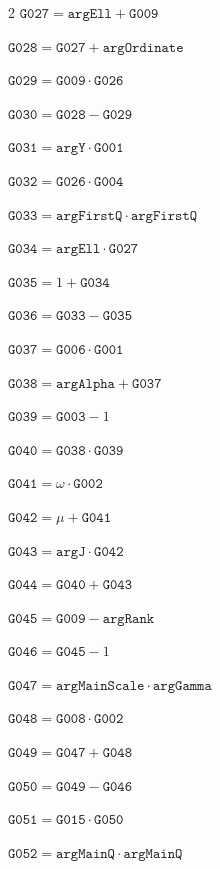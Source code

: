 \documentclass[10pt]{article}
\begin{document}
\begin{multicols}{2}
\noindent $\mathtt{G027}=\mathtt{argEll}+\mathtt{G009}$\par
\noindent $\mathtt{G028}=\mathtt{G027}+\mathtt{argOrdinate}$\par
\noindent $\mathtt{G029}=\mathtt{G009}\cdot \mathtt{G026}$\par
\noindent $\mathtt{G030}=\mathtt{G028}-\mathtt{G029}$\par
\noindent $\mathtt{G031}=\mathtt{argY}\cdot \mathtt{G001}$\par
\noindent $\mathtt{G032}=\mathtt{G026}\cdot \mathtt{G004}$\par
\noindent $\mathtt{G033}=\mathtt{argFirstQ}\cdot \mathtt{argFirstQ}$\par
\noindent $\mathtt{G034}=\mathtt{argEll}\cdot \mathtt{G027}$\par
\noindent $\mathtt{G035}=1+\mathtt{G034}$\par
\noindent $\mathtt{G036}=\mathtt{G033}-\mathtt{G035}$\par
\noindent $\mathtt{G037}=\mathtt{G006}\cdot \mathtt{G001}$\par
\noindent $\mathtt{G038}=\mathtt{argAlpha}+\mathtt{G037}$\par
\noindent $\mathtt{G039}=\mathtt{G003}-1$\par
\noindent $\mathtt{G040}=\mathtt{G038}\cdot \mathtt{G039}$\par
\noindent $\mathtt{G041}=\omega\cdot \mathtt{G002}$\par
\noindent $\mathtt{G042}=\mu+\mathtt{G041}$\par
\noindent $\mathtt{G043}=\mathtt{argJ}\cdot \mathtt{G042}$\par
\noindent $\mathtt{G044}=\mathtt{G040}+\mathtt{G043}$\par
\noindent $\mathtt{G045}=\mathtt{G009}-\mathtt{argRank}$\par
\noindent $\mathtt{G046}=\mathtt{G045}-1$\par
\noindent $\mathtt{G047}=\mathtt{argMainScale}\cdot \mathtt{argGamma}$\par
\noindent $\mathtt{G048}=\mathtt{G008}\cdot \mathtt{G002}$\par
\noindent $\mathtt{G049}=\mathtt{G047}+\mathtt{G048}$\par
\noindent $\mathtt{G050}=\mathtt{G049}-\mathtt{G046}$\par
\noindent $\mathtt{G051}=\mathtt{G015}\cdot \mathtt{G050}$\par
\noindent $\mathtt{G052}=\mathtt{argMainQ}\cdot \mathtt{argMainQ}$\par

\end{multicols}
\end{document}
